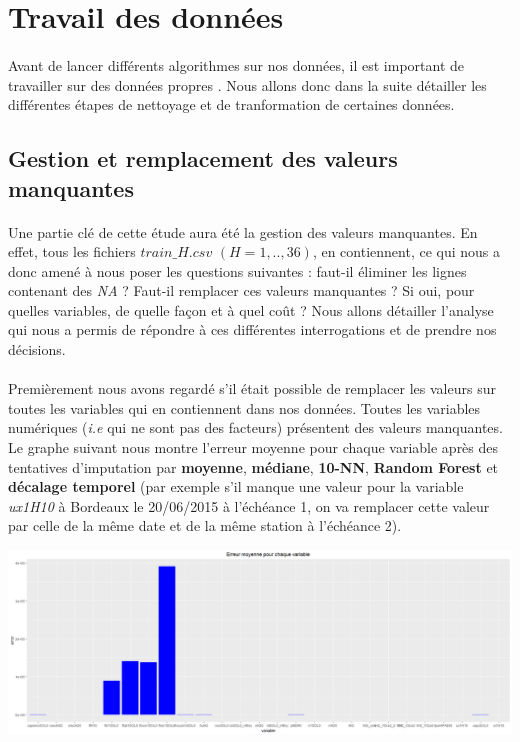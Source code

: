 \documentclass[14pt, openany]{article}
\begin{document}
\newpage
\section{Travail des données}
\paragraph{}
Avant de lancer différents algorithmes sur nos données, il est important de travailler sur des données \og propres \fg{}. Nous allons donc dans la suite détailler les différentes étapes de nettoyage et de tranformation de certaines données.
\subsection{Gestion et remplacement des valeurs manquantes}
\paragraph{}
Une partie clé de cette étude aura été la gestion des valeurs manquantes. En effet, tous les fichiers $train\_H.csv$ $(H=1,..,36)$, en contiennent, ce qui nous a donc amené à nous poser les questions suivantes : faut-il éliminer les lignes contenant des \textit{NA} ? Faut-il remplacer ces valeurs manquantes ? Si oui, pour quelles variables, de quelle façon et à quel coût ? Nous allons détailler l'analyse qui nous a permis de répondre à ces différentes interrogations et de prendre nos décisions.
\paragraph{}
Premièrement nous avons regardé s'il était possible de remplacer les valeurs sur toutes les variables qui en contiennent dans nos données. Toutes les variables numériques (\textit{i.e} qui ne sont pas des facteurs) présentent des valeurs manquantes. Le graphe suivant nous montre l'erreur moyenne pour chaque variable après des tentatives d'imputation par \textbf{moyenne}, \textbf{médiane}, \textbf{10-NN}, \textbf{Random Forest} et \textbf{décalage temporel} (par exemple s'il manque une valeur pour la variable \textit{ux1H10} à Bordeaux le 20/06/2015 à l'échéance 1, on va remplacer cette valeur par celle de la même date et de la même station à l'échéance 2).

\includegraphics[width=17cm]{Images/na_error.png}
\begin{center}
\label{fig1}
\end{center}
\end{document}
